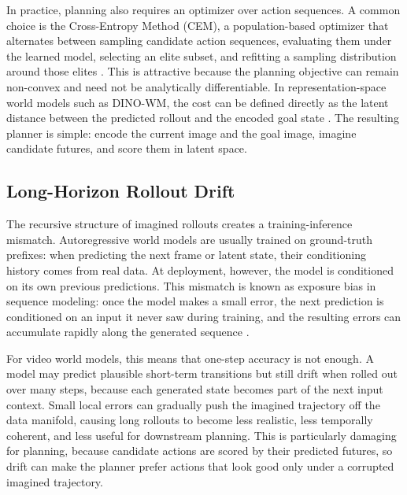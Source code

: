 \documentclass[12pt]{report}
\begin{document}
In practice, planning also requires an optimizer over action sequences. A common choice is the Cross-Entropy Method (CEM), a population-based optimizer that alternates between sampling candidate action sequences, evaluating them under the learned model, selecting an elite subset, and refitting a sampling distribution around those elites \cite{botev2013cem}. This is attractive because the planning objective can remain non-convex and need not be analytically differentiable. In representation-space world models such as DINO-WM, the cost can be defined directly as the latent distance between the predicted rollout and the encoded goal state \cite{zhou2024dinowm}. The resulting planner is simple: encode the current image and the goal image, imagine candidate futures, and score them in latent space.

\subsection{Long-Horizon Rollout Drift}
The recursive structure of imagined rollouts creates a training-inference mismatch. Autoregressive world models are usually trained on ground-truth prefixes: when predicting the next frame or latent state, their conditioning history comes from real data. At deployment, however, the model is conditioned on its own previous predictions. This mismatch is known as exposure bias in sequence modeling: once the model makes a small error, the next prediction is conditioned on an input it never saw during training, and the resulting errors can accumulate rapidly along the generated sequence \cite{bengio2015scheduled}.

For video world models, this means that one-step accuracy is not enough. A model may predict plausible short-term transitions but still drift when rolled out over many steps, because each generated state becomes part of the next input context. Small local errors can gradually push the imagined trajectory off the data manifold, causing long rollouts to become less realistic, less temporally coherent, and less useful for downstream planning. This is particularly damaging for planning, because candidate actions are scored by their predicted futures, so drift can make the planner prefer actions that look good only under a corrupted imagined trajectory.
\end{document}
